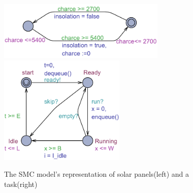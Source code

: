 \begin{figure}[H]%
	\centering
	\subfloat
	{{\includegraphics[width=8cm]{graphics/smc_solar.pdf} }}%
	\qquad
	\subfloat
	{{\includegraphics[width=6cm]{graphics/smc_task.pdf} }}%
	\caption{The SMC model's representation of solar panels(left) and a task(right)}%
	\label{fig:solar_task}%
\end{figure}